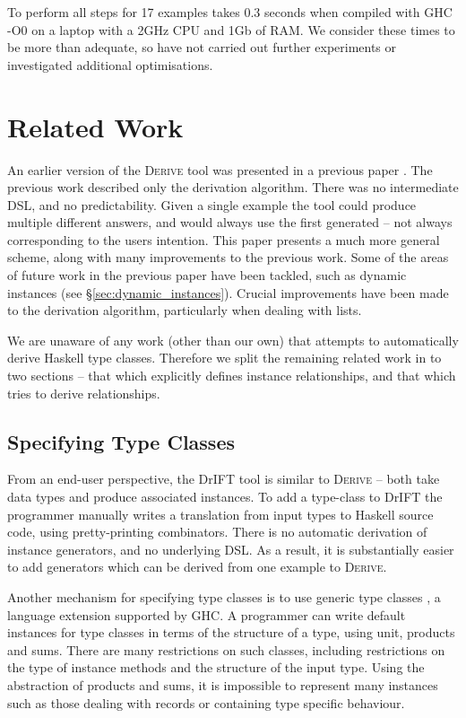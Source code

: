 \documentclass[preprint,draft]{sigplanconf}
\newcommand{\derive}{\textsc{Derive}}
\begin{document}
To perform all steps for 17 examples takes 0.3 seconds when compiled with GHC -O0 on a laptop with a 2GHz CPU and 1Gb of RAM. We consider these times to be more than adequate, so have not carried out further experiments or investigated additional optimisations.

\section{Related Work}
\label{sec:related}

An earlier version of the \derive{} tool was presented in a previous paper \cite{me:yds_derive}. The previous work described only the derivation algorithm. There was no intermediate DSL, and no predictability. Given a single example the tool could produce multiple different answers, and would always use the first generated -- not always corresponding to the users intention. This paper presents a much more general scheme, along with many improvements to the previous work. Some of the areas of future work in the previous paper have been tackled, such as dynamic instances (see \S\ref{sec:dynamic_instances}). Crucial improvements have been made to the derivation algorithm, particularly when dealing with lists.

We are unaware of any work (other than our own) that attempts to automatically derive Haskell type classes. Therefore we split the remaining related work in to two sections -- that which explicitly defines instance relationships, and that which tries to derive relationships.

\subsection{Specifying Type Classes}

From an end-user perspective, the DrIFT tool \cite{drift} is similar to \derive{} -- both take data types and produce associated instances. To add a type-class to DrIFT the programmer manually writes a translation from input types to Haskell source code, using pretty-printing combinators. There is no automatic derivation of instance generators, and no underlying DSL. As a result, it is substantially easier to add generators which can be derived from one example to \derive{}.

Another mechanism for specifying type classes is to use generic type classes \cite{hinze:derivable_type_classes}, a language extension supported by GHC. A programmer can write default instances for type classes in terms of the structure of a type, using unit, products and sums. There are many restrictions on such classes, including restrictions on the type of instance methods and the structure of the input type. Using the abstraction of products and sums, it is impossible to represent many instances such as those dealing with records or containing type specific behaviour.
\end{document}
